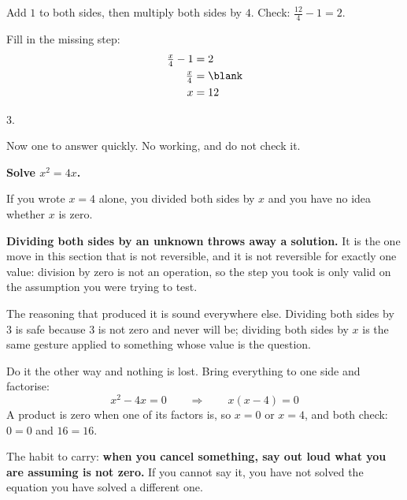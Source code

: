 \begin{fr}
Add $1$ to both sides, then multiply both sides by $4$. Check:
$\frac{12}{4} - 1 = 2$.

Fill in the missing step:
\begin{align*}
\tfrac{x}{4} - 1 &= 2 \\
\tfrac{x}{4} &= \blank \\
x &= 12
\end{align*}
\dotline
\nextframe
\end{fr}

\begin{fr}
\begin{ansblock}
$3$.
\end{ansblock}

Now one to answer quickly. No working, and do not check it.

\textbf{Solve $x^{2} = 4x$.}
\dotline
\nextframe
\end{fr}

\begin{fr}
If you wrote $x = 4$ alone, you divided both sides by $x$ \dash{} and you have
no idea whether $x$ is zero.

\begin{trapbox}
\textbf{Dividing both sides by an unknown throws away a solution.} It is the
one move in this section that is not reversible, and it is not reversible for
exactly one value: division by zero is not an operation, so the step you took
is only valid on the assumption you were trying to test.

The reasoning that produced it is sound everywhere else. Dividing both sides
by $3$ is safe because $3$ is not zero and never will be; dividing both sides
by $x$ is the same gesture applied to something whose value is the question.

Do it the other way and nothing is lost. Bring everything to one side and
factorise:
\[ x^{2} - 4x = 0 \qquad\Longrightarrow\qquad x(x - 4) = 0 \]
A product is zero when one of its factors is, so $x = 0$ or $x = 4$, and both
check: $0 = 0$ and $16 = 16$.

The habit to carry: \textbf{when you cancel something, say out loud what you
are assuming is not zero.} If you cannot say it, you have not solved the
equation \dash{} you have solved a different one.
\end{trapbox}
\end{fr}

